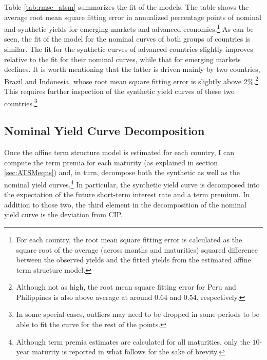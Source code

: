 {Table \ref{tab:rmse_atsm} summarizes the fit of the models. The table shows the average root mean square fitting error in annualized percentage points of nominal and synthetic yields for emerging markets and advanced economies.\footnote{For each country, the root mean square fitting error is calculated as the square root of the average (across months and maturities) squared difference between the observed yields and the fitted yields from the estimated affine term structure model.} As can be seen, the fit of the model for the nominal curves of both groups of countries is similar. The fit for the synthetic curves of advanced countries slightly improves relative to the fit for their nominal curves, while that for emerging markets declines. It is worth mentioning that the latter is driven mainly by two countries, Brazil and Indonesia, whose root mean square fitting error is slightly above 2\%.\footnote{Although not as high, the root mean square fitting error for Peru and Philippines is also above average at around 0.64 and 0.54, respectively.} This requires further inspection of the synthetic yield curves of these two countries.\footnote{In some special cases, outliers may need to be dropped in some periods to be able to fit the curve for the rest of the points.} 
	
%	


\subsection{Nominal Yield Curve Decomposition}
Once the affine term structure model is estimated for each country, I can compute the term premia for each maturity (as explained in section \ref{sec:ATSMeqns}) and, in turn, decompose both the synthetic as well as the nominal yield curves.\footnote{Although term premia estimates are calculated for all maturities, only the $10$-year maturity is reported in what follows for the sake of brevity.} In particular, the synthetic yield curve is decomposed into the expectation of the future short-term interest rate and a term premium. In addition to those two, the third element in the decomposition of the nominal yield curve is the deviation from CIP.

}
